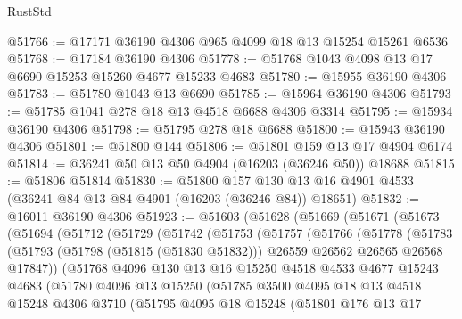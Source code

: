 \begin{lexlean}{RustStd}
\begin{coremodule}
@51766 := @17171 @36190 @4306 @965 @4099 @18 @13 @15254 @15261 @6536
@51768 := @17184 @36190 @4306
@51778 := @51768 @1043 @4098 @13 @17 @6690 @15253 @15260 @4677 @15233 @4683
@51780 := @15955 @36190 @4306
@51783 := @51780 @1043 @13 @6690
@51785 := @15964 @36190 @4306
@51793 := @51785 @1041 @278 @18 @13 @4518 @6688 @4306 @3314
@51795 := @15934 @36190 @4306
@51798 := @51795 @278 @18 @6688
@51800 := @15943 @36190 @4306
@51801 := @51800 @144
@51806 := @51801 @159 @13 @17 @4904 @6174
@51814 := @36241 @50 @13 @50 @4904 (@16203 (@36246 @50)) @18688
@51815 := @51806 @51814
@51830 := @51800
    @157
    @130
    @13
    @16
    @4901
    @4533
    (@36241 @84 @13 @84 @4901 (@16203 (@36246 @84)) @18651)
@51832 := @16011 @36190 @4306
@51923 := @51603
    (@51628
      (@51669
        (@51671
          (@51673
            (@51694
              (@51712
                (@51729
                  (@51742
                    (@51753
                      (@51757
                        (@51766
                          (@51778
                            (@51783
                              (@51793
                                (@51798 (@51815 (@51830 @51832)))
                                @26559
                                @26562
                                @26565
                                @26568
                                @17847))
                            (@51768
                              @4096
                              @130
                              @13
                              @16
                              @15250
                              @4518
                              @4533
                              @4677
                              @15243
                              @4683
                              (@51780
                                @4096
                                @13
                                @15250
                                (@51785
                                  @3500
                                  @4095
                                  @18
                                  @13
                                  @4518
                                  @15248
                                  @4306
                                  @3710
                                  (@51795
                                    @4095
                                    @18
                                    @15248
                                    (@51801
                                      @176
                                      @13
                                      @17

\end{coremodule}
\end{lexlean}
